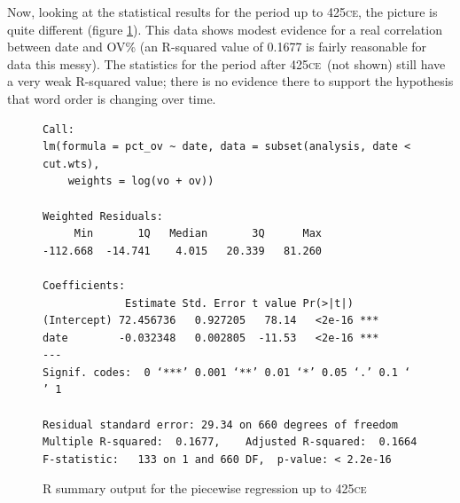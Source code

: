 \documentclass[11pt,a4paper]{scrartcl} %
\newcommand{\ce}{\textsc{ce}\ }
\begin{document}
\noindent Now, looking at the statistical results for the period up to 425\textsc{ce}, the picture is quite different (figure \ref{fig:r_piece1}). This data shows modest evidence for a real correlation between date and OV\% (an R-squared value of 0.1677 is fairly reasonable for data this messy). The statistics for the period after 425\ce (not shown) still have a very weak R-squared value; there is no evidence there to support the hypothesis that word order is changing over time.

\begin{figure}[H]
\centering
\caption{R summary output for the piecewise regression up to 425\ce}
\label{fig:r_piece1}
\phantom{xxx}
\begin{Verbatim}[fontsize=\small]
Call:
lm(formula = pct_ov ~ date, data = subset(analysis, date < cut.wts), 
    weights = log(vo + ov))

Weighted Residuals:
     Min       1Q   Median       3Q      Max 
-112.668  -14.741    4.015   20.339   81.260 

Coefficients:
             Estimate Std. Error t value Pr(>|t|)    
(Intercept) 72.456736   0.927205   78.14   <2e-16 ***
date        -0.032348   0.002805  -11.53   <2e-16 ***
---
Signif. codes:  0 ‘***’ 0.001 ‘**’ 0.01 ‘*’ 0.05 ‘.’ 0.1 ‘ ’ 1

Residual standard error: 29.34 on 660 degrees of freedom
Multiple R-squared:  0.1677,    Adjusted R-squared:  0.1664 
F-statistic:   133 on 1 and 660 DF,  p-value: < 2.2e-16
\end{Verbatim}
\end{figure}
\end{document}
